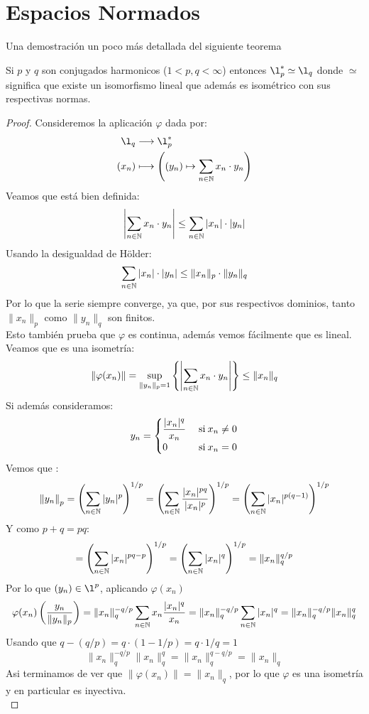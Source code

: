 \documentclass[12pt,a4paper]{book}
\begin{document}
\chapter{Espacios Normados}
Una demostración un poco más detallada del siguiente teorema
\begin{teo}
Si $p$ y $q$ son conjugados harmonicos ($ 1 < p,q < \infty $) entonces  $\l_p^* \simeq \l_q$ donde $\simeq$ significa que existe un isomorfismo lineal que además es isométrico con sus respectivas normas.
\begin{proof}
Consideremos la aplicación $\varphi$ dada por:
\begin{align*}
\l_q &\longrightarrow \l_p^* \\
(x_n) &\longmapsto \left((y_n) \mapsto \sum_{n \in \N} x_n \cdot y_n\right)
\end{align*}
Veamos que está bien definida:
$$ \left| \sum_{n \in \mathbb{N}} x_n \cdot y_n \right| \leq \sum_{n \in \mathbb{N}} |x_n| \cdot |y_n| $$
Usando la desigualdad de Hölder:
$$ \sum_{n \in \mathbb{N}} |x_n| \cdot |y_n| \leq \|x_n\|_p \cdot \|y_n\|_q$$
Por lo que la serie siempre converge, ya que, por sus respectivos dominios, tanto $ \|x_n\|_p$ como $\|y_n\|_q$ son finitos.\\
Esto también prueba que $\varphi$ es continua, además vemos fácilmente que es lineal. Veamos que es una isometría:
$$ \|\varphi(x_n)\| = \sup_{\|y_n\|_p = 1} \left\lbrace \left| \sum_{n \in \mathbb{N}} x_n \cdot y_n \right|  \right\rbrace \leq \|x_n\|_q$$
Si además consideramos:
$$ y_n =
\begin{cases}
\dfrac{|x_n|^{q}}{x_n} &\mathrm{\;si\:} x_n \neq 0 \\
0 &\mathrm{\;si\:} x_n=0 
\end{cases}
$$
Vemos que :
$$\left\|y_n\right\|_p = \left( \sum_{n \in \mathbb{N}} |y_n|^p \right)^{1/p} = \left( \sum_{n \in \mathbb{N}} \dfrac{|x_n|^{pq}}{|x_n|^p}\right)^{1/p} = \left( \sum_{n \in \mathbb{N}} |x_n|^{p(q-1)}\right)^{1/p}$$
Y como $p+q = pq$:
$$ = \left( \sum_{n \in \mathbb{N}} |x_n|^{pq-p}\right)^{1/p} = \left( \sum_{n \in \mathbb{N}} |x_n|^{q}\right)^{1/p} = \|x_n\|_q^{q/p}$$
Por lo que $(y_n) \in \l^p$, aplicando $\varphi(x_n)$
$$\varphi(x_n)\left(\dfrac{y_n}{\|y_n\|_p}\right) = \|x_n\|_q^{-q/p} \sum_{n\in\mathbb{N}} x_n \dfrac{|x_n|^q}{x_n} = \|x_n\|_q^{-q/p} \sum_{n\in\mathbb{N}} |x_n|^q = \|x_n\|_q^{-q/p} \|x_n\|_q^q$$
Usando que $q-(q/p)= q \cdot (1-1/p)= q \cdot 1/q =1$
$$\|x_n\|_q^{-q/p} \|x_n\|_q^q = \|x_n\|_q^{q-q/p} = \|x_n\|_q$$
Asi terminamos de ver que $\|\varphi(x_n)\| = \|x_n\|_q$, por lo que $\varphi$ es una isometría y en particular es inyectiva.\\

\end{proof}
\end{teo}
\end{document}
